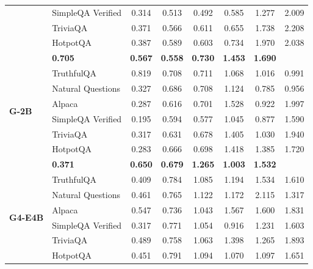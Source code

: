 \begin{table}[ht]
\begin{tabular}{ll cccccc}
        & SimpleQA Verified \cite{haas_simpleqa_2026} & 0.314 & 0.513 & 0.492 & 0.585 & 1.277 & 2.009 \\
        & TriviaQA \cite{joshi2017triviaqa} & 0.371 & 0.566 & 0.611 & 0.655 & 1.738 & 2.208 \\
        & HotpotQA \cite{yang2018hotpotqa} & 0.387 & 0.589 & 0.603 & 0.734 & 1.970 & 2.038 \\
        \rowcolor[gray]{.95} \multicolumn{2}{r}{\textbf{Total SGS}} & \textbf{0.705} & \textbf{0.567} & \textbf{0.558} & \textbf{0.730} & \textbf{1.453} & \textbf{1.690} \\
        \midrule
        \multirow{6}{*}{\textbf{G-2B}}
        & TruthfulQA \cite{lin2022truthfulqa} & 0.819 & 0.708 & 0.711 & 1.068 & 1.016 & 0.991 \\
        & Natural Questions \cite{kwiatkowski2019natural} & 0.327 & 0.686 & 0.708 & 1.124 & 0.785 & 0.956 \\
        & Alpaca \cite{taori2023stanford-alpaca} & 0.287 & 0.616 & 0.701 & 1.528 & 0.922 & 1.997 \\
        & SimpleQA Verified \cite{haas_simpleqa_2026} & 0.195 & 0.594 & 0.577 & 1.045 & 0.877 & 1.590 \\
        & TriviaQA \cite{joshi2017triviaqa} & 0.317 & 0.631 & 0.678 & 1.405 & 1.030 & 1.940 \\
        & HotpotQA \cite{yang2018hotpotqa} & 0.283 & 0.666 & 0.698 & 1.418 & 1.385 & 1.720 \\
        \rowcolor[gray]{.95} \multicolumn{2}{r}{\textbf{Total SGS}} & \textbf{0.371} & \textbf{0.650} & \textbf{0.679} & \textbf{1.265} & \textbf{1.003} & \textbf{1.532} \\
        \midrule
        \multirow{6}{*}{\textbf{G4-E4B}}
        & TruthfulQA \cite{lin2022truthfulqa} & 0.409 & 0.784 & 1.085 & 1.194 & 1.534 & 1.610 \\
        & Natural Questions \cite{kwiatkowski2019natural} & 0.461 & 0.765 & 1.122 & 1.172 & 2.115 & 1.317 \\
        & Alpaca \cite{taori2023stanford-alpaca} & 0.547 & 0.736 & 1.043 & 1.567 & 1.600 & 1.831 \\
        & SimpleQA Verified \cite{haas_simpleqa_2026} & 0.317 & 0.771 & 1.054 & 0.916 & 1.231 & 1.603 \\
        & TriviaQA \cite{joshi2017triviaqa} & 0.489 & 0.758 & 1.063 & 1.398 & 1.265 & 1.893 \\
        & HotpotQA \cite{yang2018hotpotqa} & 0.451 & 0.791 & 1.094 & 1.070 & 1.097 & 1.651 \\

\end{tabular}
\end{table}
